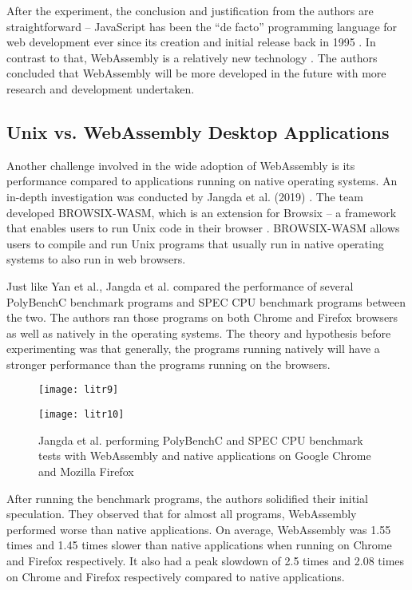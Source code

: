After the experiment, the conclusion and justification from the authors are straightforward – JavaScript has been the “de facto” programming language for web development ever since its creation and initial release back in 1995 \cite{lit18}. In contrast to that, WebAssembly is a relatively new technology \cite{lit19}. The authors concluded that WebAssembly will be more developed in the future with more research and development undertaken.

\bigskip
\subsection{Unix vs. WebAssembly Desktop Applications}

Another challenge involved in the wide adoption of WebAssembly is its performance compared to applications running on native operating systems. An in-depth investigation was conducted by Jangda et al. (2019) \cite{lit20}. The team developed BROWSIX-WASM, which is an extension for Browsix – a framework that enables users to run Unix code in their browser \cite{lit21}. BROWSIX-WASM allows users to compile and run Unix programs that usually run in native operating systems to also run in web browsers.

Just like Yan et al., Jangda et al. compared the performance of several PolyBenchC benchmark programs and SPEC CPU benchmark programs between the two. The authors ran those programs on both Chrome and Firefox browsers as well as natively in the operating systems. The theory and hypothesis before experimenting was that generally, the programs running natively will have a stronger performance than the programs running on the browsers.

\bigskip
\begin{figure}[hp]
\centering
\texttt{[image: litr9]}
\captionsetup{aboveskip=0pt,font=it}
\end{figure}

\begin{figure}[hp]
\centering
\texttt{[image: litr10]}
\caption{\footnotesize{Jangda et al. performing PolyBenchC and SPEC CPU benchmark tests with WebAssembly and native applications on Google Chrome and Mozilla Firefox \cite{lit20}}}
\captionsetup{aboveskip=0pt,font=it}
\end{figure}
\bigskip

After running the benchmark programs, the authors solidified their initial speculation. They observed that for almost all programs, WebAssembly performed worse than native applications. On average, WebAssembly was 1.55 times and 1.45 times slower than native applications when running on Chrome and Firefox respectively. It also had a peak slowdown of 2.5 times and 2.08 times on Chrome and Firefox respectively compared to native applications.

